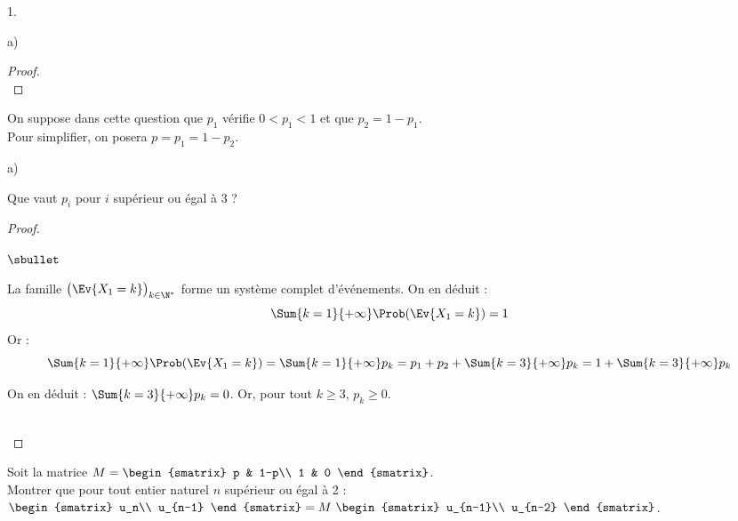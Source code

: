 \documentclass[11pt]{article}%
\begin{document}
\begin{noliste}{1.}
\begin{noliste}{a)}
\begin{proof}


      ~\\[-1.2cm]
    \end{proof}
  \end{noliste}

\item On suppose dans cette question que $p_1$ vérifie $0<p_1<1$ et
  que $p_2 = 1 - p_1$.\\
  Pour simplifier, on posera $p = p_1 = 1 - p_2$.
  \begin{noliste}{a)}
  \item Que vaut $p_i$ pour $i$ supérieur ou égal à 3 ?

    \begin{proof}~%
      \begin{noliste}{$\sbullet$}
      \item La famille $\big( \Ev{X_1 = k} \big)_{k \in \N^*}$ forme
        un système complet d'événements. On en déduit :
        \[
        \Sum{k = 1}{+\infty} \Prob(\Ev{X_1 = k}) = 1
        \]
        Or :
        \[
        \Sum{k = 1}{+\infty} \Prob(\Ev{X_1 = k}) = \Sum{k =
          1}{+\infty} p_k = p_1 + p_2 + \Sum{k = 3}{+\infty} p_k = 1 +
        \Sum{k = 3}{+\infty} p_k
        \]
        
      \item On en déduit : $\Sum{k = 3}{+\infty} p_k = 0$. Or,
        pour tout $k \geq 3$, $p_k \geq 0$.
      \end{noliste}
      ~\\[-1.2cm]
    \end{proof}




  \item Soit la matrice $M =
    \begin{smatrix}
      p & 1-p\\
      1 & 0 
    \end{smatrix}$.\\
    Montrer que pour tout entier naturel $n$ supérieur ou égal à 2 : $
    \begin{smatrix}
      u_n\\ 
      u_{n-1} 
    \end{smatrix}
    = M \ 
    \begin{smatrix}
      u_{n-1}\\
      u_{n-2} 
    \end{smatrix}
    $.


\end{noliste}
\end{noliste}
\end{document}
